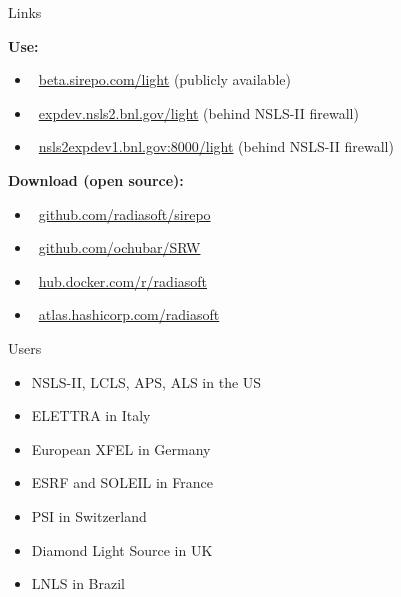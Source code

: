 \documentclass[final]{beamer}
\newlength{\onecolwid}
\newcommand{\colorify}[1]{\textcolor{linkcolor}{#1}}
\newcommand{\mylinkn}[2]{\href{#1}{\colorify{#2}}}
\begin{document}
\begin{frame}[t]
\begin{columns}[t]
\begin{column}{\onecolwid}
\begin{block}{\faLink{} Links}

\textbf{\faGears{} Use:}

\begin{itemize}
  \item[\faGear{}]~\mylinkn{https://beta.sirepo.com/light}{beta.sirepo.com/light} (publicly available)
  \item[\faGear{}]~\mylinkn{https://expdev.nsls2.bnl.gov/light}{expdev.nsls2.bnl.gov/light} (behind NSLS-II firewall)
  \item[\faGear{}]~\mylinkn{http://nsls2expdev1.bnl.gov:8000/light}{nsls2expdev1.bnl.gov:8000/light} (behind NSLS-II firewall)
\end{itemize}

\textbf{\faDownload{} Download (open source):}

\begin{itemize}
  \item[\faGithub{}]~\mylinkn{https://github.com/radiasoft/sirepo}{github.com/radiasoft/sirepo}
  \item[\faGithub{}]~\mylinkn{https://github.com/ochubar/SRW}{github.com/ochubar/SRW}
  \item[\faShip{}]~\mylinkn{https://hub.docker.com/r/radiasoft/sirepo/tags/}{hub.docker.com/r/radiasoft}
  \item[\faCloudDownload{}]~\mylinkn{https://atlas.hashicorp.com/radiasoft/boxes/sirepo}{atlas.hashicorp.com/radiasoft}
\end{itemize}

\end{block}

\begin{block}{\faUsers{} Users}
\begin{itemize}
  \item NSLS-II, LCLS, APS, ALS in the US
  \item ELETTRA in Italy
  \item European XFEL in Germany
  \item ESRF and SOLEIL in France
  \item PSI in Switzerland
  \item Diamond Light Source in UK
  \item LNLS in Brazil
\end{itemize}
\end{block}



\end{column}
\end{columns}
\end{frame}
\end{document}
